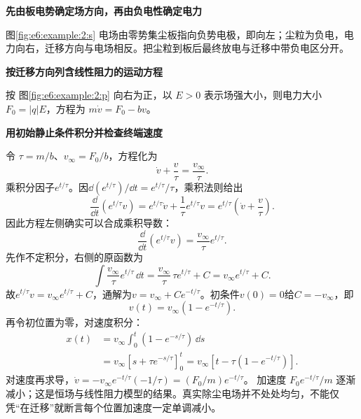 \begin{solution}\textbf{先由板电势确定场方向，再由负电性确定电力}\par\nobreak
图\ref{fig:e6:example:2:s} 电场由零势集尘板指向负势电极，即向左；尘粒为负电，电力向右，迁移方向与电场相反。把尘粒到板后最终放电与迁移中带负电区分开。



\par\medskip{}\noindent\textbf{按迁移方向列含线性阻力的运动方程}\par\nobreak
按 图\ref{fig:e6:example:2:p} 向右为正，以 $E>0$ 表示场强大小，则电力大小 $F_0=|q|E$，方程为 $m\dot v=F_0-bv$。

\par\medskip{}\noindent\textbf{用初始静止条件积分并检查终端速度}\par\nobreak
令 $\tau=m/b$、$v_\infty=F_0/b$，方程化为
\[
\dot v+\frac v\tau=\frac{v_\infty}{\tau}.
\]
乘积分因子$e^{t/\tau}$。因$\dd(e^{t/\tau})/\dd t=e^{t/\tau}/\tau$，乘积法则给出
\[
\frac{\dd}{\dd t}(e^{t/\tau}v)
=e^{t/\tau}\dot v+\frac1\tau e^{t/\tau}v
=e^{t/\tau}\left(\dot v+\frac v\tau\right).
\]
因此方程左侧确实可以合成乘积导数：
\[
\frac{\dd}{\dd t}(e^{t/\tau}v)=\frac{v_\infty}{\tau}e^{t/\tau}.
\]
先作不定积分，右侧的原函数为
\[
\int\frac{v_\infty}{\tau}e^{t/\tau}\,\dd t
=\frac{v_\infty}{\tau}\,\tau e^{t/\tau}+C
=v_\infty e^{t/\tau}+C.
\]
故$e^{t/\tau}v=v_\infty e^{t/\tau}+C$，通解为$v=v_\infty+Ce^{-t/\tau}$。初条件$v(0)=0$给$C=-v_\infty$，即
\[
v(t)=v_\infty(1-e^{-t/\tau}).
\]
再令初位置为零，对速度积分：
\begin{align*}
x(t)&=v_\infty\int_0^t(1-e^{-s/\tau})\,\dd s\\
&=v_\infty[s+\tau e^{-s/\tau}]_0^t
=v_\infty[t-\tau(1-e^{-t/\tau})].
\end{align*}
对速度再求导，$\dot v=-v_\infty e^{-t/\tau}(-1/\tau)
=(F_0/m)e^{-t/\tau}$。
加速度 $F_0e^{-t/\tau}/m$ 逐渐减小；这是恒场与线性阻力模型的结果。真实除尘电场并不处处均匀，不能仅凭“在迁移”就断言每个位置加速度一定单调减小。\end{solution}
